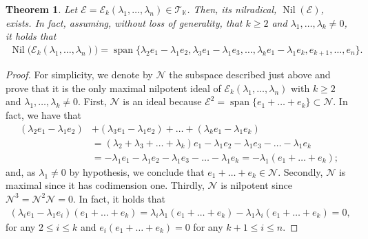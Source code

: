 \documentclass[12pt,reqno]{amsart}
\newtheorem{theorem}{Theorem}[section]
\theoremstyle{definition}
\theoremstyle{remark}
\DeclareMathOperator{\spa}{span}
\DeclareMathOperator{\nil}{Nil}
\numberwithin{equation}{section}
\begin{document}
\begin{theorem}\label{th:nilrad_dim1}
	Let $\mathcal{E}=\mathcal{E}_k(\lambda_1,\dots,\lambda_n)\in\mathcal{T}_\mathbb{K}$. Then, its nilradical, $\nil(\mathcal{E})$, exists. In fact, assuming, without loss of generality, that $k\geq2$ and $\lambda_1,\dots,\lambda_k\neq0$, it holds that
	\begin{align*}
	\nil\big(\mathcal{E}_k(\lambda_1,\dots,\lambda_n)\big)=\spa\{\lambda_2e_1-\lambda_1e_2,\lambda_3e_1-\lambda_1e_3,\dots,\lambda_ke_1-\lambda_1e_k,e_{k+1},\dots,e_n\}.
	\end{align*}
\end{theorem}
\begin{proof}
	For simplicity, we denote by $\mathcal{N}$ the subspace described just above and prove that it is the only maximal nilpotent ideal of  $\mathcal{E}_k(\lambda_1,\dots,\lambda_n)$ with $k\geq2$ and $\lambda_1,\dots,\lambda_k\neq0$. First, $\mathcal{N}$ is an ideal because $\mathcal{E}^2=\spa\{e_1+\dots+e_k\}\subset\mathcal{N}$. In fact, we have that
	\begin{align*}
		(\lambda_2e_1-\lambda_1e_2)&+(\lambda_3e_1-\lambda_1e_2)+\dots+(\lambda_ke_1-\lambda_1e_k)\\&
		=(\lambda_2+\lambda_3+\dots+\lambda_k)e_1-\lambda _1e_2-\lambda_1e_3-\dots-\lambda_1e_k\\&
		=-\lambda_1e_1-\lambda _1e_2-\lambda_1e_3-\dots-\lambda_1e_k
		=-\lambda_1(e_1+\dots+e_k);
	\end{align*}
	and, as $\lambda_1\neq0$ by hypothesis, we conclude that $e_1+\dots+e_k\in\mathcal{N}$. Secondly, $\mathcal{N}$ is maximal since it has codimension one. Thirdly, $\mathcal{N}$ is nilpotent since $\mathcal{N}^3=\mathcal{N}^2\mathcal{N}=0$. In fact, it holds that
	\begin{align}\label{eq:para_siguiente_th}
		(\lambda_ie_1-\lambda_1e_i)(e_1+\dots+e_k)=\lambda_i\lambda_1(e_1+\dots+e_k)-\lambda_1\lambda_i(e_1+\dots+e_k)=0,
	\end{align}
for any $2\leq i\leq k$ and $e_i(e_1+\dots+e_k)=0$ for any $k+1\leq i\leq n$. 


\end{proof}
\end{document}
